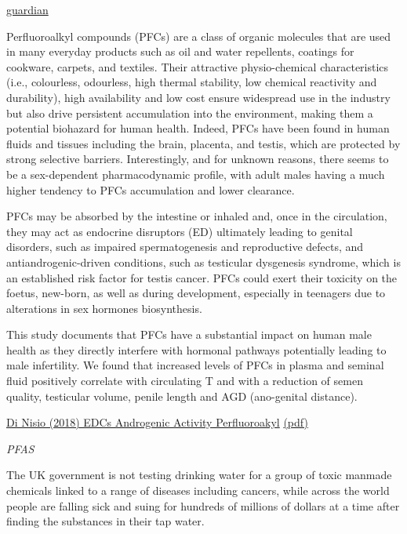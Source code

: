 \documentclass[
]{book}
\begin{document}
\href{https://www.theguardian.com/commentisfree/2021/mar/18/toxic-chemicals-health-humanity-erin-brokovich}{guardian}

Perfluoroalkyl compounds (PFCs) are a class of organic molecules that are used in many
everyday products such as oil and water repellents, coatings for cookware, carpets, and
textiles. Their attractive physio-chemical characteristics (i.e., colourless, odourless, high
thermal stability, low chemical reactivity and durability), high availability and low cost
ensure widespread use in the industry but also drive persistent accumulation into the
environment, making them a potential biohazard for human health.
Indeed, PFCs have been found in human fluids and tissues including
the brain, placenta, and testis, which are protected by strong selective barriers.
Interestingly, and for unknown reasons, there
seems to be a sex-dependent pharmacodynamic profile, with adult males having a much
higher tendency to PFCs accumulation and lower clearance.

PFCs may be absorbed by the intestine or inhaled and,
once in the circulation, they may act as endocrine disruptors (ED) ultimately leading to
genital disorders, such as impaired spermatogenesis and reproductive defects, and
antiandrogenic-driven conditions, such as testicular dysgenesis syndrome, which is an
established risk factor for testis cancer.
PFCs could exert their toxicity on the foetus,
new-born, as well as during development, especially in teenagers due to alterations in sex
hormones biosynthesis.

This study documents that PFCs have a substantial impact on human male health as they
directly interfere with hormonal pathways potentially leading to male infertility. We found
that increased levels of PFCs in plasma and seminal fluid positively correlate with circulating
T and with a reduction of semen quality, testicular volume, penile length and AGD (ano-genital distance).

\href{https://www.documentcloud.org/documents/5316830-EDCs-Androgenic-Activity-Perfluoroakyl.html}{Di Nisio (2018) EDCs Androgenic Activity Perfluoroakyl}
\href{pdf/Di_Nisio_2018_EDCs-Androgenic-Activity-Perfluoroakyl.pdf}{(pdf)}

\emph{PFAS}

The UK government is not testing drinking water for a group of toxic manmade chemicals linked to a range of diseases including cancers, while across the world people are falling sick and suing for hundreds of millions of dollars at a time after finding the substances in their tap water.
\end{document}
